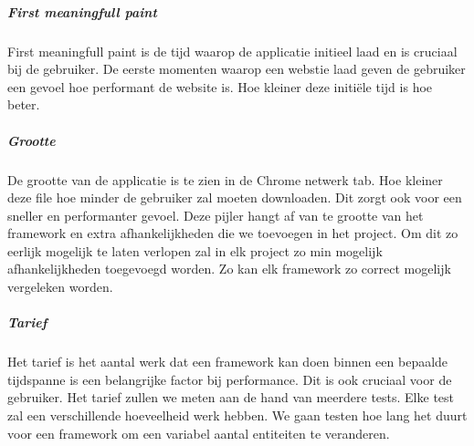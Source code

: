 \subparagraph{First meaningfull paint}
First meaningfull paint is de tijd waarop de applicatie initieel laad en is cruciaal bij de gebruiker. De eerste momenten waarop een webstie laad geven de gebruiker een gevoel hoe performant de website is. Hoe kleiner deze initiële tijd is hoe beter.

\subparagraph{Grootte}
De grootte van de applicatie is te zien in de Chrome netwerk tab. Hoe kleiner deze file hoe minder de gebruiker zal moeten downloaden. Dit zorgt ook voor een sneller en performanter gevoel. Deze pijler hangt af van te grootte van het framework en extra afhankelijkheden die we toevoegen in het project. Om dit zo eerlijk mogelijk te laten verlopen zal in elk project zo min mogelijk afhankelijkheden toegevoegd worden. Zo kan elk framework zo correct mogelijk vergeleken worden.

\subparagraph{Tarief}
Het tarief is het aantal werk dat een framework kan doen binnen een bepaalde tijdspanne is een belangrijke factor bij performance. Dit is ook cruciaal voor de gebruiker. Het tarief zullen we meten aan de hand van meerdere tests. Elke test zal een verschillende hoeveelheid werk hebben. We gaan testen hoe lang het duurt voor een framework om een variabel aantal entiteiten te veranderen.








